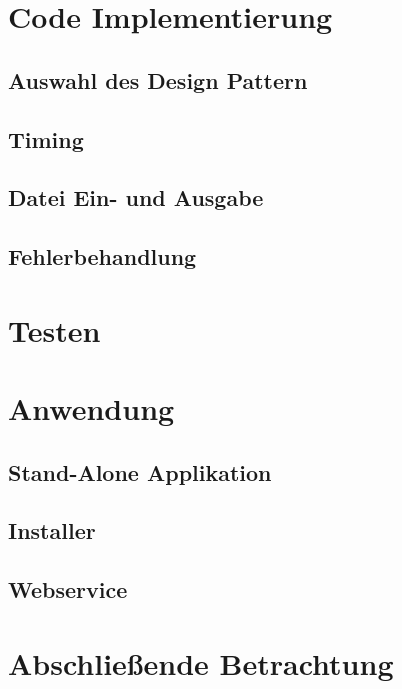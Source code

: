 \section{Code Implementierung}
		\subsection{Auswahl des Design Pattern} %
		\subsection{Timing}
		\subsection{Datei Ein- und Ausgabe}
		\subsection{Fehlerbehandlung}

\section{Testen}		

\section{Anwendung}
	\subsection{Stand-Alone Applikation}
	\subsection{Installer}
	\subsection{Webservice}

\section{Abschließende Betrachtung}

